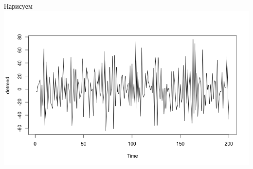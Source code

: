 \documentclass{article}
\begin{document}
Нарисуем  \newline
\includegraphics[width=\linewidth]{Rplot.png}\newpage
\end{document}
